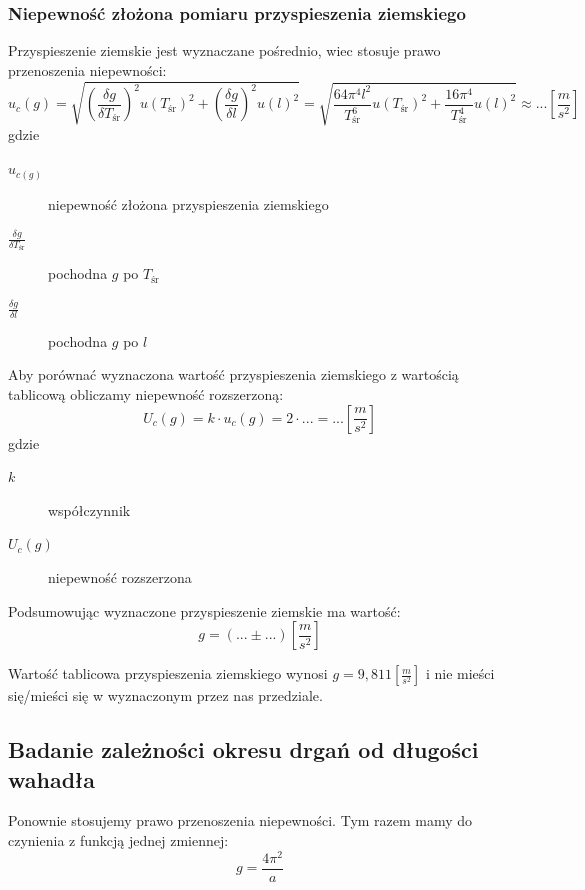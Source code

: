 \documentclass [a4paper,11pt]{article}
\begin{document}
\subsubsection{Niepewność złożona pomiaru przyspieszenia ziemskiego}
\indent Przyspieszenie ziemskie jest wyznaczane pośrednio, wiec stosuje prawo przenoszenia niepewności:
\begin{equation}
u_c(g) = \sqrt{\left(  \frac{\delta g}{\delta T_{\text{śr}}} \right)^2 u(T_{\text{śr}})^2 + \left( \frac{\delta g}{\delta l} \right)^2 u(l)^2  } = \sqrt{\frac{64 \pi^4 l^2}{T_{\text{śr}}^6} u(T_{\text{śr}})^2 + \frac{16 \pi^4}{T_{\text{śr}}^4} u(l)^2}\approx ... \left[ \frac{m}{s^2} \right] 
\end{equation}
gdzie
\begin{description}
\item [$u_{c(g)}$] niepewność złożona przyspieszenia ziemskiego
\item [$ \frac{\delta g}{\delta T_{\text{śr}}} $] pochodna $g$ po $T_{\text{śr}}$
\item [$\frac{\delta g}{\delta l}$] pochodna $g$ po $l$
\end{description}

\indent Aby porównać wyznaczona wartość przyspieszenia ziemskiego z wartością tablicową obliczamy niepewność rozszerzoną:
\begin{equation}
	U_c(g) = k \cdot u_c(g) = 2 \cdot ... = ... \left[ \frac{m}{s^2} \right]
\end{equation} 
gdzie
\begin{description}
\item [$k$] współczynnik
\item [$U_c(g)$] niepewność rozszerzona
\end{description}

\indent Podsumowując wyznaczone przyspieszenie ziemskie ma wartość:
\begin{equation}
g = (... \pm ...)\left[ \frac{m}{s^2} \right]  
\end{equation}
 
\indent Wartość tablicowa przyspieszenia ziemskiego wynosi $g= 9,811 \left[ \frac{m}{s^2} \right] $ i  nie mieści się/mieści się w wyznaczonym przez nas przedziale.

\subsection{Badanie zależności okresu drgań od długości wahadła}
\indent Ponownie stosujemy prawo przenoszenia niepewności. Tym razem mamy do czynienia z funkcją jednej zmiennej: 
\begin{equation}
 g= \frac{4 \pi^2}{a}
\end{equation}
\end{document}
